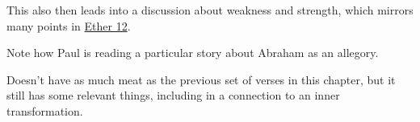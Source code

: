 \begin{compactdesc}
\begin{compactitem}
					\end{compactitem}
				\item[{\hyperref[ROMANS-15-20]{Romans 15:20--21}}]
				\item[{\hyperref[1CORINTHIANS-2]{1 Corinthians 2}}]
				\item[{\hyperref[2CORINTHIANS-3-3]{2 Corinthians 3:3}}]
				\item[{\hyperref[2CORINTHIANS-3-18]{2 Corinthians 3:18}}]
				\item[{\hyperref[2CORINTHIANS-4-3]{2 Corinthians 4:3--7}}]
				\item[{\hyperref[2CORINTHIANS-12-1]{2 Corinthians 12:1--7}}] \phantom{.}
					\begin{compactitem}
						\item This also then leads into a discussion about weakness and strength, which mirrors many points in \hyperref[ETHER-12]{Ether 12}.
					\end{compactitem}
				\item[{\hyperref[2CORINTHIANS-13-1]{2 Corinthians 13:1}}]
				\item[{\hyperref[GALATIANS-1-11]{Galatians 1:11--12}}]
				\item[{\hyperref[GALATIANS-1-15]{Galatians 1:15--16}}]
				\item[{\hyperref[GALATIANS-4-22]{Galatians 4:22--31}}] \phantom{.}
					\begin{compactitem}
						\item Note how Paul is reading a particular story about Abraham as an allegory.
					\end{compactitem}
				\item[{\hyperref[EPHESIANS-1-7]{Ephesians 1:7--9}}]
				\item[{\hyperref[EPHESIANS-1-17]{Ephesians 1:17--19}}]
				\item[{\hyperref[EPHESIANS-3-1]{Ephesians 3:1--12}}]
				\item[{\hyperref[EPHESIANS-3-14]{Ephesians 3:14--21}}] \phantom{.}
					\begin{compactitem}
						\item Doesn't have as much meat as the previous set of verses in this chapter, but it still has some relevant things, including in a connection to an inner transformation.
					\end{compactitem}
				\item[{\hyperref[PHILIPPIANS-1-9]{Philippians 1:9--11}}]
				\item[{\hyperref[COLOSSIANS-1-9]{Colossians 1:9--13}}]
				\item[{\hyperref[COLOSSIANS-1-25]{Colossians 1:25--29}}]
				\item[{\hyperref[COLOSSIANS-2-2]{Colossians 2:2--3}}]
			\end{compactdesc}
			
